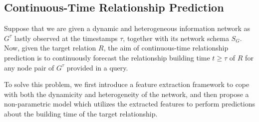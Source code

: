 \subsection{Continuous-Time Relationship Prediction}
Suppose that we are given a dynamic and heterogeneous information network as $G^{\tau}$ lastly observed at the timestamps $\tau$, together with its network schema $S_G$. Now, given the target relation $R$, the aim of continuous-time relationship prediction is to continuously forecast the relationship building time $t\ge \tau$ of $R$ for any node pair of $G^{\tau}$ provided in a query.

To solve this problem, we first introduce a feature extraction framework to cope with both the dynamicity and heterogeneity of the network, and then propose a non-parametric model which utilizes the extracted features to perform predictions about the building time of the target relationship.
